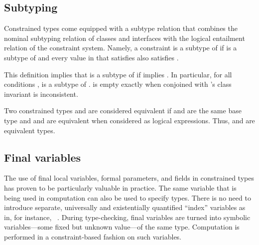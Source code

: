 \subsection{Subtyping}
Constrained types come equipped with a subtype relation that
combines the nominal subtyping relation of classes and interfaces with
the logical entailment relation of the constraint system. Namely, a
constraint  is a subtype of  if  is a
subtype of  and every value in  that satisfies 
also satisfies .


This definition 
implies that
 is a subtype of  if 
implies .
In particular, for all conditions ,
 is a subtype of .
 is empty exactly
when  conjoined with 's class invariant is inconsistent.

Two constrained types
 and 
are considered
equivalent if  and  are the same base type and
 and  are equivalent when considered as logical
expressions. Thus,  and  are
equivalent types.

\subsection{Final variables}

The use of final local variables, formal parameters, and
fields in constrained
types has proven to be particularly valuable in practice. The same
variable that is being used in computation can also be used to specify
types. There is no need to introduce separate, universally and
existentially quantified ``index'' variables as in, for
instance, \DML{}~\cite{xi99dependent}.
%
During type-checking, final variables are turned into symbolic
variables---some fixed but unknown value---of the same type.
Computation is performed in a constraint-based fashion on such
variables.

